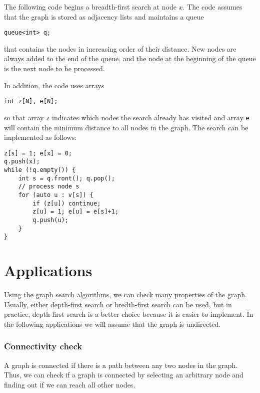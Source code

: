 The following code begins a breadth-first
search at node $x$.
The code assumes that the graph is stored
as adjacency lists and maintains a queue
\begin{lstlisting}
queue<int> q;
\end{lstlisting}
that contains the nodes in increasing order
of their distance.
New nodes are always added to the end
of the queue, and the node at the beginning
of the queue is the next node to be processed.

In addition, the code uses arrays
\begin{lstlisting}
int z[N], e[N];
\end{lstlisting}
so that array \texttt{z} indicates
which nodes the search already has visited
and array \texttt{e} will contain the
minimum distance to all nodes in the graph.
The search can be implemented as follows:
\begin{lstlisting}
z[s] = 1; e[x] = 0;
q.push(x);
while (!q.empty()) {
    int s = q.front(); q.pop();
    // process node s
    for (auto u : v[s]) {
        if (z[u]) continue;
        z[u] = 1; e[u] = e[s]+1;
        q.push(u);
    }
}
\end{lstlisting}

\section{Applications}

Using the graph search algorithms,
we can check many properties of the graph.
Usually, either depth-first search or
bredth-first search can be used,
but in practice, depth-first search
is a better choice because it is
easier to implement.
In the following applications we will
assume that the graph is undirected.

\subsubsection{Connectivity check}


A graph is connected if there is a path
between any two nodes in the graph.
Thus, we can check if a graph is connected
by selecting an arbitrary node and
finding out if we can reach all other nodes.

